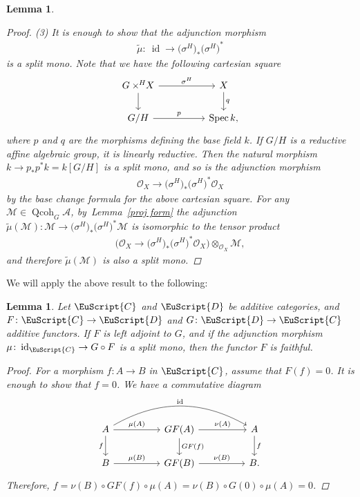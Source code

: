 \documentclass[10pt,a4paper]{amsart}
\newtheorem{lem}[dfn]{Lemma}
\numberwithin{equation}{section}
\newcommand{\Spec}{\operatorname{Spec}}
\newcommand{\Qcoh}{\operatorname{Qcoh}}
\newcommand{\id}{\operatorname{id}}
\newcommand{\cA}{\mathcal{A}}
\newcommand{\cM}{\mathcal{M}}
\newcommand{\cO}{\mathcal{O}}
\newcommand{\scrC}{\EuScript{C}}
\newcommand{\scrD}{\EuScript{D}}
\newcommand{\timesH}{\times^{\hspace{-0.2mm}H\hspace{0.2mm}}\!\!}
\begin{document}
\begin{lem}
\begin{proof}
(3) It is enough to show that the adjunction morphism
\begin{gather*}
\widetilde{\mu}\colon\ \id \to \big(\sigma^H\big)_*\big(\sigma^H\big)^*
\end{gather*}
is a split mono.
 Note that we have the following cartesian square
\[
\begin{tikzcd}
G\timesH X\arrow[rr,"\sigma^H"]\arrow[d]&&X\arrow[d, "q"]
\\
G/H\arrow[rr, "p"]&&\Spec k,
\end{tikzcd}
\]
where $p$ and $q$ are the morphisms defining the base field $k$.
If $G/H$ is a reductive affine algebraic group, it is linearly reductive. Then the natural morphism
$k\to p_*p^*k=k[G/H]$
is a split mono, and so is the adjunction morphism
\begin{gather*}
\cO_X\to\big(\sigma^H\big)_*\big(\sigma^H\big)^*\cO_{X}
\end{gather*}
by the base change formula for the above cartesian square. For any $\cM\in \Qcoh_G\cA$, by~Lem\-ma~\ref{proj form} the adjunction $\widetilde{\mu}(\cM)\colon \cM\to \big(\sigma^H\big)_*\big(\sigma^H\big)^*\cM$ is isomorphic to the tensor product \begin{gather*}\Bigr(\cO_X\to\big(\sigma^H\big)_*\big(\sigma^H\big)^*\cO_{X}\Bigr)\otimes_{\cO_X}\cM,\end{gather*} and therefore $\widetilde{\mu}(\cM)$ is also a split mono.
\end{proof}
\end{lem}


We will apply the above result to the following:

\begin{lem}\label{faithful general}
Let $\scrC$ and $\scrD$ be additive categories, and
$F\colon \scrC\to \scrD$ and $G\colon \scrD\to \scrC$ additive functors. If $F$ is left adjoint to $G$, and if the adjunction morphism $\mu\colon \id_{\scrC}\to G\circ F$ is a split mono, then the functor $F$ is faithful.
\begin{proof}
For a morphism $f\colon A\to B$ in $\scrC$, assume that $F(f)=0$. It is enough to show that $f=0$. We have a commutative diagram
\[
\begin{tikzcd}
A\arrow[rr, "\mu(A)"]\arrow[rrrr, bend left, "\id"]\arrow[d, "f"']&&GF(A)\arrow[d, "GF(f)"]\arrow[rr, "\nu(A)"]&&A\arrow[d, "f"]\\
B\arrow[rr, "\mu(B)"]&&GF(B)\arrow[rr, "\nu(B)"]&& B.
\end{tikzcd}
\]
Therefore, $f=\nu(B)\circ GF(f)\circ \mu(A)=\nu(B)\circ G(0)\circ \mu(A)=0$.
\end{proof}
\end{lem}
\end{document}
